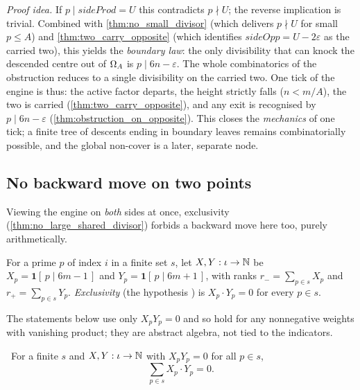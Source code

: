 \emph{Proof idea.} If $p\mid\mathit{sideProd}=U$ this contradicts $p\nmid U$; the reverse
implication is trivial. Combined with \cref{thm:no_small_divisor} (which delivers $p\nmid U$ for
small $p\le A$) and \cref{thm:two_carry_opposite} (which identifies $\mathit{sideOpp}=U-2\varepsilon$
as the carried two), this yields the \emph{boundary law}: the only divisibility that can knock the
descended centre out of $\Omega_A$ is $p\mid 6n-\varepsilon$. The whole combinatorics of the
obstruction reduces to a single divisibility on the carried two. One tick of the engine is thus:
the active factor departs, the height strictly falls ($n<m/A$), the two is carried
(\cref{thm:two_carry_opposite}), and any exit is recognised by $p\mid 6n-\varepsilon$
(\cref{thm:obstruction_on_opposite}). This closes the \emph{mechanics} of one tick; a finite tree of
descents ending in boundary leaves remains combinatorially possible, and the global non-cover is a
later, separate node.

\subsection{No backward move on two points}

Viewing the engine on \emph{both} sides at once, exclusivity
(\cref{thm:no_large_shared_divisor}) forbids a backward move here too, purely arithmetically.

\begin{definition}\label{def:indicators}
For a prime $p$ of index $i$ in a finite set $s$, let $X,Y:\iota\to\mathbb{N}$ be
$X_p=\mathbf{1}[\,p\mid 6m-1\,]$ and $Y_p=\mathbf{1}[\,p\mid 6m+1\,]$, with ranks
$r_-=\sum_{p\in s}X_p$ and $r_+=\sum_{p\in s}Y_p$. \emph{Exclusivity} (the hypothesis )
is $X_p\cdot Y_p=0$ for every $p\in s$.
\end{definition}

The statements below use only $X_p Y_p=0$ and so hold for any nonnegative weights with vanishing
product; they are abstract algebra, not tied to the indicators.

\begin{theorem}\label{thm:exclusive_diag_zero}
\green{}\ For a finite $s$ and $X,Y:\iota\to\mathbb{N}$ with $X_p Y_p=0$ for all $p\in s$,
\begin{equation}\label{eq:diag-zero}
\sum_{p\in s}X_p\cdot Y_p=0.
\end{equation}
\end{theorem}

